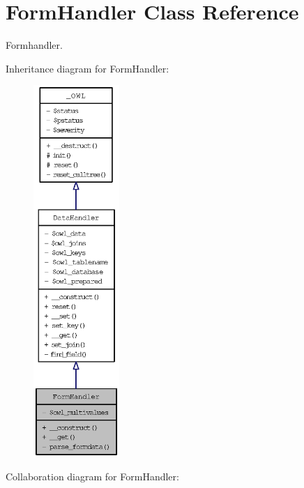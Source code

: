 \hypertarget{classFormHandler}{
\section{FormHandler Class Reference}
\label{classFormHandler}
}
Formhandler.  


Inheritance diagram for FormHandler:\nopagebreak
\begin{figure}[H]
\begin{center}
\leavevmode
\includegraphics[height=400pt]{classFormHandler__inherit__graph}
\end{center}
\end{figure}
Collaboration diagram for FormHandler:\nopagebreak
